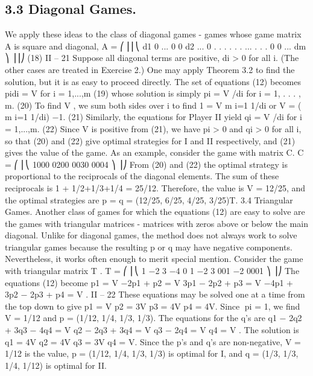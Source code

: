 \documentclass[]{report}
\begin{document}
\subsection{3.3 Diagonal Games.} We apply these ideas to the class of diagonal games - games
whose game matrix A is square and diagonal,
A =
⎛
⎜⎜⎝
d1 0 ... 0
0 d2 ... 0 .
.
. .
.
. ... .
.
.
0 0 ... dm
⎞
⎟⎟⎠
(18)
II – 21
Suppose all diagonal terms are positive, di > 0 for all i. (The other cases are treated in
Exercise 2.) One may apply Theorem 3.2 to find the solution, but it is as easy to proceed
directly. The set of equations (12) becomes
pidi = V for i = 1,...,m (19)
whose solution is simply
pi = V /di for i = 1, . . . , m. (20)
To find V , we sum both sides over i to find
1 = V 
m
i=1
1/di or V = (
m
i=1
1/di)
−1. (21)
Similarly, the equations for Player II yield
qi = V /di for i = 1,...,m. (22)
Since V is positive from (21), we have pi > 0 and qi > 0 for all i, so that (20) and (22)
give optimal strategies for I and II respectively, and (21) gives the value of the game.
As an example, consider the game with matrix C.
C =
⎛
⎜⎝
1000
0200
0030
0004
⎞
⎟⎠
From (20) and (22) the optimal strategy is proportional to the reciprocals of the diagonal
elements. The sum of these reciprocals is 1 + 1/2+1/3+1/4 = 25/12. Therefore, the
value is V = 12/25, and the optimal strategies are p = q = (12/25, 6/25, 4/25, 3/25)T.
3.4 Triangular Games. Another class of games for which the equations (12) are
easy to solve are the games with triangular matrices - matrices with zeros above or below
the main diagonal. Unlike for diagonal games, the method does not always work to solve
triangular games because the resulting p or q may have negative components. Nevertheless,
it works often enough to merit special mention. Consider the game with triangular matrix
T .
T =
⎛
⎜⎝
1 −2 3 −4
0 1 −2 3
001 −2
0001
⎞
⎟⎠
The equations (12) become
p1 = V
−2p1 + p2 = V
3p1 − 2p2 + p3 = V
−4p1 + 3p2 − 2p3 + p4 = V .
II – 22
These equations may be solved one at a time from the top down to give
p1 = V p2 = 3V p3 = 4V p4 = 4V.
Since pi = 1, we find V = 1/12 and p = (1/12, 1/4, 1/3, 1/3). The equations for the q’s
are
q1 − 2q2 + 3q3 − 4q4 = V
q2 − 2q3 + 3q4 = V
q3 − 2q4 = V
q4 = V .
The solution is
q1 = 4V q2 = 4V q3 = 3V q4 = V.
Since the p’s and q’s are non-negative, V = 1/12 is the value, p = (1/12, 1/4, 1/3, 1/3) is
optimal for I, and q = (1/3, 1/3, 1/4, 1/12) is optimal for II.
\end{document}
